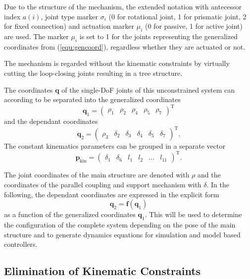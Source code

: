 \documentclass[letterpaper, 10 pt, conference]{ieeeconf}  %
\begin{document}
Due to the structure of the mechanism, the extended notation with antecessor index $a(i)$, joint type marker $\sigma_i$ (0 for rotational joint, 1 for prismatic joint, 2 for fixed connection) and actuation marker $\mu_i$ (0 for passive, 1 for active joint) are used.
The marker $\mu_i$ is set to 1 for the joints representing the generalized coordinates from (\ref{equ:gencoord}), regardless whether they are actuated or not.

The mechanism is regarded without the kinematic constraints by virtually cutting the loop-closing joints resulting in a tree structure.

The coordinates $\bm{q}$ of the single-DoF joints of this unconstrained system can according to \cite{NakamuraGho1989} be separated into the generalized coordinates
%
\begin{equation}
\bm{q}_1=\begin{pmatrix}\rho_1 & \rho_2 & \rho_4 & \rho_5 &\rho_7 \end{pmatrix}^\mathrm{T}
\end{equation}
%
and the dependant coordinates
%
\begin{equation}
\bm{q}_2=\begin{pmatrix}\rho_3 & \delta_2 & \delta_3 & \delta_4 & \delta_5 & \delta_7 \end{pmatrix}^\mathrm{T}.
\label{equ:gencoord}
\end{equation}
%
The constant kinematics parameters can be grouped in a separate vector
%
\begin{equation}
\bm{p}_\mathrm{kin}=\begin{pmatrix}\delta_1 & \delta_6 & l_1 & l_2 & ... & l_{11} \end{pmatrix}^\mathrm{T}.
\label{equ:kinparam}
\end{equation}

The joint coordinates of the main structure are denoted with $\rho$ and the coordinates of the parallel coupling and support mechanism with $\delta$.
%
In the following, the dependant coordinates are expressed in the explicit form
%
\begin{equation}
\bm{q}_2=\bm{f}(\bm{q}_1)
\label{equ:kinconstr_explicit}
\end{equation}
%
as a function of the generalized coordinates $\bm{q}_1$.
This will be used to determine the configuration of the complete system depending on the pose of the main structure and to generate dynamics equations for simulation and model based controllers.

\subsection{Elimination of Kinematic Constraints}
\end{document}
